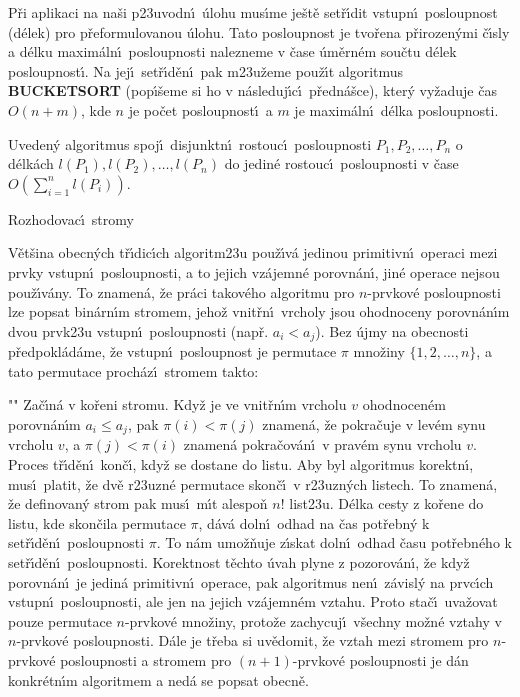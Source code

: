 \flushpar P\v ri aplikaci na na\v si p\accent23uvodn\'\i\ \'ulohu mus\'\i me 
je\v st\v e set\v r\'\i dit vstupn\'\i\ posloupnost (d\'elek) pro p\v reformu\-lo\-vanou \'ulohu.
Tato posloupnost je tvo\v rena p\v rirozen\'ymi \v c\'\i sly a d\'elku 
maxim\'aln\'\i\ posloupnosti nalezneme v \v case \'um\v ern\'em sou\v ctu 
d\'elek posloupnost\'\i . Na jej\'\i\ set\v r\'\i d\v en\'\i\ pak 
m\accent23u\v zeme pou\v z\'\i t algoritmus {\bf BUCKETSORT} (pop\'\i \v seme si ho v 
n\'asleduj\'\i c\'\i\ p\v redn\'a\v sce), kter\'y 
vy\v zaduje \v cas $O(n+m)$, kde $n$ je po\v cet posloupnost\'\i\ a $
m$ je 
maxim\'aln\'\i\ d\'elka posloupnosti.
\medskip

Uveden\'y algoritmus spoj\'\i\ 
disjunktn\'\i\ rostou\-c\'\i\ 
po\-sloup\-nosti $P_1,P_2,\dots,P_n$ o d\'elk\'ach $l(P_1),l(P_2)
,\dots,l(P_n)$ 
do jedin\'e rostouc\'\i\ posloupnosti v \v case 
$O(\sum_{i=1}^nl(P_i))$.
\endproclaim

\heading
Rozhodovac\'\i\ stromy
\endheading


\flushpar V\v et\v sina obecn\'ych t\v r\'\i dic\'\i ch algoritm\accent23u 
pou\v z\'\i v\'a jedinou primitivn\'\i\ operaci mezi prvky vstupn\'\i\ 
posloupnosti, a to jejich vz\'a\-jemn\'e porov\-n\'an\'\i , jin\'e 
operace nejsou pou\v z\'\i v\'any. To znamen\'a, \v ze pr\'aci 
takov\'eho algoritmu pro $n$-prvkov\'e posloupnosti lze po\-psat 
bin\'arn\'\i m stro\-mem, jeho\v z vnit\v rn\'\i\ vrcholy jsou ohodnoceny 
porovn\'an\'\i m dvou prvk\accent23u vstupn\'\i\ posloupnosti 
(nap\v r. $a_i<a_j$). Bez \'ujmy na obecnosti p\v redpokl\'ad\'ame, \v ze 
vstupn\'\i\ posloupnost je permutace $\pi$
mno\v ziny $\{1,2,\dots,n\}$, a tato permutace proch\'az\'\i\ 
stromem takto:
\roster
\item"{}"
Za\v c\'\i n\'a v ko\v reni stromu. Kdy\v z je ve vnit\v rn\'\i m vrcholu $
v$ 
ohodnocen\'em porovn\'an\'\i m $a_i\le a_j$, pak $\pi (i)<\pi (j)$ znamen\'a, 
\v ze pokra\v cuje v lev\'em synu vrcholu $v$, a $\pi (j)<\pi (i)$ 
znamen\'a pokra\v cov\'an\'\i\ v prav\'em synu vrcholu $v$. Proces 
t\v r\'\i d\v en\'\i\ kon\v c\'\i , kdy\v z se dostane do listu.
\endroster
Aby byl algoritmus korektn\'\i , mus\'\i\ platit, \v ze dv\v e 
r\accent23uzn\'e permutace skon\v c\'\i\ v r\accent23uzn\'ych 
listech.  To znamen\'a, \v ze definovan\'y strom pak mus\'\i\ m\'\i t 
alespo\v n $n!$ list\accent23u.  D\'elka cesty z ko\v rene do listu, 
kde skon\v cila permutace $\pi$, d\'av\'a doln\'\i\ odhad na \v cas 
pot\v rebn\'y k set\v r\'\i d\v en\'\i\ posloupnosti $\pi$. To n\'am umo\v z\v nuje 
z\'\i skat doln\'\i\ odhad \v casu pot\v rebn\'eho k set\v r\'\i d\v en\'\i\ 
posloupnosti. Korektnost t\v echto \'uvah plyne z pozorov\'an\'\i , 
\v ze kdy\v z porovn\'an\'\i\ je jedin\'a primi\-tivn\'\i\ operace, pak 
algoritmus nen\'\i\ z\'avisl\'y na prvc\'\i ch vstup\-n\'\i\ 
posloupnosti, ale jen na jejich vz\'ajemn\'em vztahu. 
Proto sta\v c\'\i\ uva\v zovat pouze permutace $n$-prvkov\'e mno\v ziny, 
proto\v ze za\-chycuj\'\i\ v\v sechny mo\v zn\'e vztahy v $n$-prvkov\'e 
posloupnosti. D\'a\-le je t\v reba si uv\v edomit, \v ze vztah mezi 
stromem pro $n$-prvkov\'e posloupnosti a stromem pro 
$(n+1)$-prvkov\'e posloupnosti je d\'an konkr\'etn\'\i m algoritmem a 
ned\'a se popsat obecn\v e. 
\medskip

